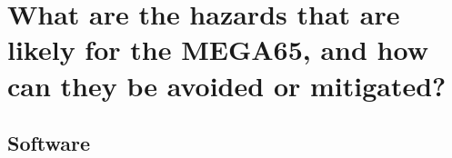 
\chapter{What are the hazards that are likely for the MEGA65, and how can they be avoided or mitigated?}
\label{Chapter6}

\section{Software}

